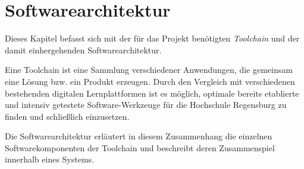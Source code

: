 \section{Softwarearchitektur}\label{softwarearchitektur}
Dieses Kapitel befasst sich mit der für das Projekt benötigten \emph{Toolchain}
und der damit einhergehenden Softwarearchitektur.

Eine Toolchain ist eine Sammlung verschiedener Anwendungen, die gemeinsam eine
Lösung bzw. ein Produkt erzeugen. Durch den Vergleich mit verschiedenen
bestehenden digitalen Lernplattformen ist es möglich, optimale bereits
etablierte und intensiv getestete Software-Werkzeuge für die Hochschule
Regensburg zu finden und schließlich einzusetzen.

Die Softwarearchitektur erläutert in diesem Zusammenhang die einzelnen
Softwarekomponenten der Toolchain und beschreibt deren Zusammenspiel innerhalb
eines Systems.



\newpage


\newpage


\newpage

